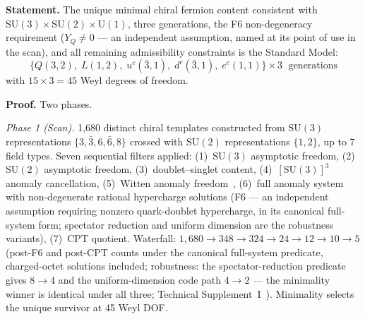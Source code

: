 \documentclass[11pt]{article}
\newcommand{\SU}{\mathrm{SU}}
\newcommand{\U}{\mathrm{U}}
\begin{document}
\begin{tcolorbox}[apfbox, title={Theorem $T_{\mathrm{field}}$ (SM Fermion Content)}]
\textbf{Statement.}  The unique minimal chiral fermion content consistent with $\SU(3) \times \SU(2) \times \U(1)$, three generations, the F6 non-degeneracy requirement ($Y_Q \neq 0$ --- an independent assumption, named at its point of use in the scan), and all remaining admissibility constraints is the Standard Model:
\begin{equation}
\{Q(3,2),\; L(1,2),\; u^c(\bar{3},1),\; d^c(\bar{3},1),\; e^c(1,1)\} \times 3 \;\text{ generations}
\label{eq:fermion_content}
\end{equation}
with $15 \times 3 = 45$ Weyl degrees of freedom.

\smallskip\noindent\textbf{Proof.}  Two phases.

\textit{Phase 1 (Scan).}  1{,}680 distinct chiral templates constructed from $\SU(3)$ representations $\{3, \bar{3}, 6, \bar{6}, 8\}$ crossed with $\SU(2)$ representations $\{1, 2\}$, up to 7 field types.  Seven sequential filters applied: (1)~$\SU(3)$ asymptotic freedom, (2)~$\SU(2)$ asymptotic freedom, (3)~doublet--singlet content, (4)~$[\SU(3)]^3$ anomaly cancellation, (5)~Witten anomaly freedom~\cite{Witten1982}, (6)~full anomaly system with non-degenerate rational hypercharge solutions (F6 --- an independent assumption requiring nonzero quark-doublet hypercharge, in its canonical full-system form; spectator reduction and uniform dimension are the robustness variants), (7)~CPT quotient.  Waterfall: $1{,}680 \to 348 \to 324 \to 24 \to 12 \to 10 \to 5$ (post-F6 and post-CPT counts under the canonical full-system predicate, charged-octet solutions included; robustness: the spectator-reduction predicate gives $8 \to 4$ and the uniform-dimension code path $4 \to 2$ --- the minimality winner is identical under all three; Technical Supplement~I~\cite{BrookeP2Supplement}).  Minimality selects the unique survivor at 45 Weyl DOF.


\end{tcolorbox}
\end{document}

